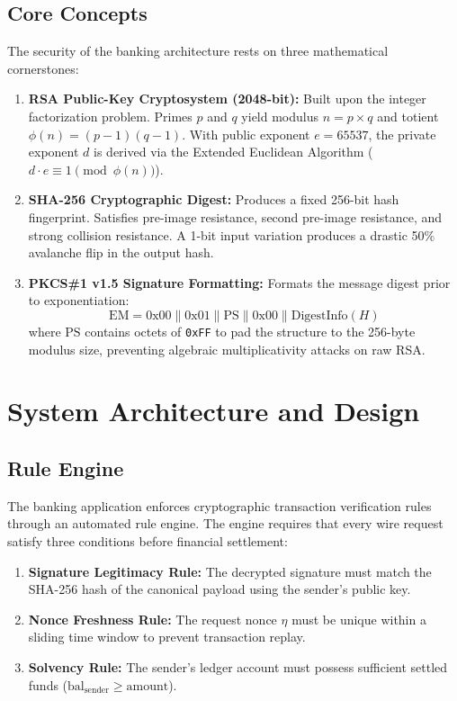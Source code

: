 \documentclass[11pt,a4paper]{article}
\begin{document}
\subsection{Core Concepts}
The security of the banking architecture rests on three mathematical cornerstones:
\begin{enumerate}
    \item \textbf{RSA Public-Key Cryptosystem (2048-bit):} Built upon the integer factorization problem. Primes $p$ and $q$ yield modulus $n = p \times q$ and totient $\phi(n) = (p - 1)(q - 1)$. With public exponent $e = 65537$, the private exponent $d$ is derived via the Extended Euclidean Algorithm ($d \cdot e \equiv 1 \pmod{\phi(n)}$).
    \item \textbf{SHA-256 Cryptographic Digest:} Produces a fixed 256-bit hash fingerprint. Satisfies pre-image resistance, second pre-image resistance, and strong collision resistance. A 1-bit input variation produces a drastic 50\% avalanche flip in the output hash.
    \item \textbf{PKCS\#1 v1.5 Signature Formatting:} Formats the message digest prior to exponentiation:
    \begin{equation}
        \text{EM} = \text{0x00} \parallel \text{0x01} \parallel \text{PS} \parallel \text{0x00} \parallel \text{DigestInfo}(H)
    \end{equation}
    where $\text{PS}$ contains octets of \texttt{0xFF} to pad the structure to the 256-byte modulus size, preventing algebraic multiplicativity attacks on raw RSA.
\end{enumerate}

\section{System Architecture and Design}

\subsection{Rule Engine}
The banking application enforces cryptographic transaction verification rules through an automated rule engine. The engine requires that every wire request satisfy three conditions before financial settlement:
\begin{enumerate}
    \item \textbf{Signature Legitimacy Rule:} The decrypted signature must match the SHA-256 hash of the canonical payload using the sender's public key.
    \item \textbf{Nonce Freshness Rule:} The request nonce $\eta$ must be unique within a sliding time window to prevent transaction replay.
    \item \textbf{Solvency Rule:} The sender's ledger account must possess sufficient settled funds ($\text{bal}_{\text{sender}} \ge \text{amount}$).
\end{enumerate}
\end{document}
